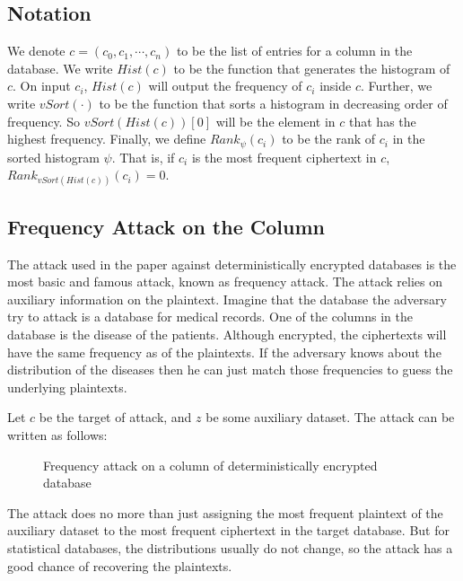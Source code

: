 \subsection{Notation}
We denote $c = (c_0, c_1, \cdots, c_n)$ to be the list of entries for a column in the database. We write $Hist(c)$ to be the function that generates the histogram of $c$. On input $c_i$, $Hist(c)$ will output the frequency of $c_i$ inside $c$. Further, we write $vSort(\cdot)$ to be the function that sorts a histogram in decreasing order of frequency. So $vSort(Hist(c))[0]$ will be the element in $c$ that has the highest frequency. Finally, we define $Rank_{\psi}(c_i)$ to be the rank of $c_i$ in the sorted histogram $\psi$. That is, if $c_i$ is the most frequent ciphertext in $c$, $Rank_{vSort(Hist(c))}(c_i) = 0$.


\subsection{Frequency Attack on the Column}
The attack used in the paper against deterministically encrypted databases is the most basic and famous attack, known as frequency attack. The attack relies on auxiliary information on the plaintext. Imagine that the database the adversary try to attack is a database for medical records. One of the columns in the database is the disease of the patients. Although encrypted, the ciphertexts will have the same frequency as of the plaintexts. If the adversary knows about the distribution of the diseases then he can just match those frequencies to guess the underlying plaintexts.

Let $c$ be the target of attack, and $z$ be some auxiliary dataset. The attack can be written as follows:

\begin{figure}[H]
\begin{center}
\end{center}
\caption{Frequency attack on a column of deterministically encrypted database}
\end{figure}


The attack does no more than just assigning the most frequent plaintext of the auxiliary dataset to the most frequent ciphertext in the target database. But for statistical databases, the distributions usually do not change, so the attack has a good chance of recovering the plaintexts.

